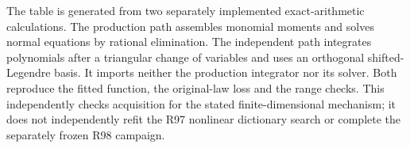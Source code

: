 
The table is generated from two separately implemented exact-arithmetic calculations. The production path assembles monomial moments and solves normal equations by rational elimination. The independent path integrates polynomials after a triangular change of variables and uses an orthogonal shifted-Legendre basis. It imports neither the production integrator nor its solver. Both reproduce the fitted function, the original-law loss and the range checks. This independently checks acquisition for the stated finite-dimensional mechanism; it does not independently refit the R97 nonlinear dictionary search or complete the separately frozen R98 campaign.
